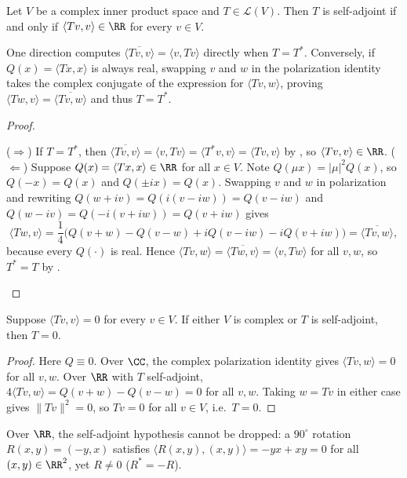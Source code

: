 \documentclass[10pt]{scrartcl}
\newcommand{\LL}{\mathcal L}\newcommand{\PP}{\mathcal P}\newcommand{\MM}{\mathcal M}
\begin{document}
\begin{theorem*}
  Let $V$ be a complex inner product space and $T\in\LL(V)$. Then $T$ is self-adjoint if and only if $\langle Tv,v\rangle\in\RR$ for every $v\in V$.
\end{theorem*}
\begin{ideabox}
  One direction computes $\overline{\langle Tv,v\rangle}=\langle v,Tv\rangle$ directly when $T=T^*$. Conversely, if $Q(x)=\langle Tx,x\rangle$ is always real, swapping $v$ and $w$ in the polarization identity takes the complex conjugate of the expression for $\langle Tv,w\rangle$, proving $\langle Tw,v\rangle=\overline{\langle Tv,w\rangle}$ and thus $T=T^*$.
\end{ideabox}
\begin{proof}
  \begin{steps}
    \ii ($\Rightarrow$) If $T=T^*$, then $\overline{\langle Tv,v\rangle}=\langle v,Tv\rangle=\langle T^*v,v\rangle=\langle Tv,v\rangle$ by , so $\langle Tv,v\rangle\in\RR$.
    \ii ($\Leftarrow$) Suppose $Q(x)=\langle Tx,x\rangle\in\RR$ for all $x\in V$. Note $Q(\mu x)=|\mu|^2 Q(x)$, so $Q(-x)=Q(x)$ and $Q(\pm ix)=Q(x)$. Swapping $v$ and $w$ in polarization and rewriting $Q(w+iv)=Q(i(v-iw))=Q(v-iw)$ and $Q(w-iv)=Q(-i(v+iw))=Q(v+iw)$ gives
    \[
      \langle Tw,v\rangle = \frac{1}{4}\bigl(Q(v+w)-Q(v-w)+iQ(v-iw)-iQ(v+iw)\bigr) = \overline{\langle Tv,w\rangle},
    \]
    because every $Q(\cdot)$ is real. Hence $\langle Tv,w\rangle = \overline{\langle Tw,v\rangle} = \langle v,Tw\rangle$ for all $v,w$, so $T^*=T$ by .
  \end{steps}
\end{proof}

\begin{theorem*}
  Suppose $\langle Tv,v\rangle=0$ for every $v\in V$. If either $V$ is complex or $T$ is self-adjoint, then $T=0$.
\end{theorem*}
\begin{proof}
  Here $Q\equiv 0$. Over $\CC$, the complex polarization identity gives $\langle Tv,w\rangle=0$ for all $v,w$. Over $\RR$ with $T$ self-adjoint, $4\langle Tv,w\rangle=Q(v+w)-Q(v-w)=0$ for all $v,w$. Taking $w=Tv$ in either case gives $\|Tv\|^2=0$, so $Tv=0$ for all $v\in V$, i.e.\ $T=0$.
\end{proof}

Over $\RR$, the self-adjoint hypothesis cannot be dropped: a $90^\circ$ rotation $R(x,y)=(-y,x)$ satisfies $\langle R(x,y),(x,y)\rangle = -yx+xy = 0$ for all $(x,y)\in\RR^2$, yet $R\neq0$ ($R^*=-R$).
\end{document}
